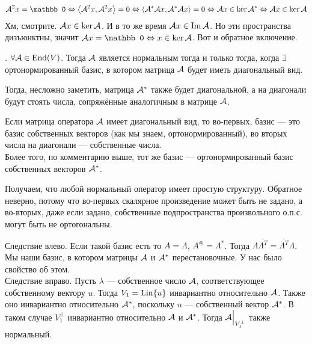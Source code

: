 \documentclass{article}
\DeclareMathOperator{\operIm}{Im}
\let\Im\operIm
\begin{document}
\begin{itemize}
\begin{Proof}
            $$
            \scriptA^2x=\mathbb0\Leftrightarrow\dotprod{\scriptA^2x}{\scriptA^2x}=0\Leftrightarrow\dotprod{\scriptA^*\scriptA x}{\scriptA^*\scriptA x}=0\Leftrightarrow\scriptA x\in\ker\scriptA^*\Leftrightarrow\scriptA x\in\ker\scriptA
            $$
            Хм, смотрите. ${\mathcal{A}} x\in\ker{\mathcal{A}}$. И в то же время $\scriptA x\in\Im\scriptA$. Но эти пространства дизъюнктны, значит $\scriptA x=\mathbb0\Leftrightarrow x\in\ker\scriptA$. Вот и обратное включение.
        \end{Proof}
        \thm {}. $\forall{\mathcal{A}}\in\operatorname{End}(V)$. Тогда ${\mathcal{A}}$ является нормальным тогда и только тогда, когда $\exists$ортонормированный базис, в котором матрица ${\mathcal{A}}$ будет иметь диагональный вид.
        \begin{Comment}
            Тогда, несложно заметить, матрица ${\mathcal{A}}^*$ также будет диагональной, а на диагонали будут стоять числа, сопряжённые аналогичным в матрице ${\mathcal{A}}$.
        \end{Comment}
        \begin{Comment}
            Если матрица оператора ${\mathcal{A}}$ имеет диагональный вид, то во-первых, базис --- это базис собственных векторов (как мы знаем, ортонормированный), во вторых числа на диагонали --- собственные числа.\\
            Более того, по комментарию выше, тот же базис --- ортонормированный базис собственных векторов ${\mathcal{A}}^*$.
        \end{Comment}
        \begin{Comment}
            Получаем, что любой нормальный оператор имеет простую структуру. Обратное неверно, потому что во-первых скалярное произведение может быть не задано, а во-вторых, даже если задано, собственные подпространства произвольного о.п.с. могут быть не ортогональны.
        \end{Comment}
        \begin{Proof}
            Следствие влево. Если такой базис есть то $A=\Lambda$, $A^\circledast=\Lambda^*$. Тогда $\Lambda\overline{\Lambda^T}=\overline{\Lambda^T}\Lambda$. Мы наши базис, в котором матрицы ${\mathcal{A}}$ и ${\mathcal{A}}^*$ перестановочные. У нас было свойство об этом.\\
            Следствие вправо. Пусть $\lambda$ --- собственное число ${\mathcal{A}}$, соответствующее собственному вектору $u$. Тогда $V_1=\operatorname{Lin}\{u\}$ инвариантно относительно ${\mathcal{A}}$. Также оно инвариантно относительно ${\mathcal{A}}^*$, поскольку $u$ --- собственный вектор ${\mathcal{A}}^*$. В таком случае $V_1^\perp$ инвариантно относительно ${\mathcal{A}}$ и ${\mathcal{A}}^*$. Тогда ${\mathcal{A}}\Big|_{V_1^\perp}$ также нормальный.\\

\end{Proof}
\end{itemize}
\end{document}
